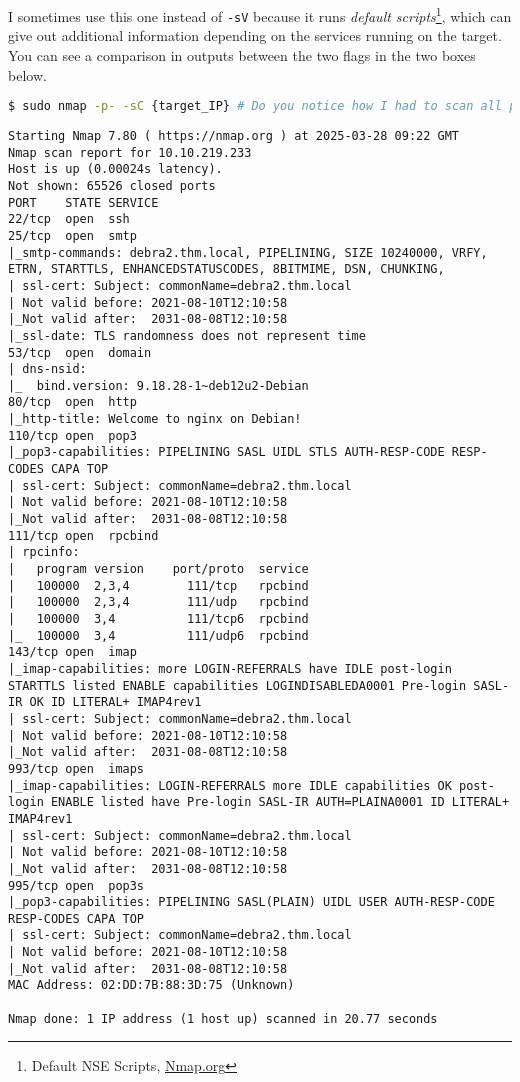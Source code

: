 \documentclass[11pt,a4paper]{article}
\newenvironment{commandbox}[1][]{
  \begin{tcolorbox}[
      colback=kalibackground,
      colframe=commandcolor,
      fonttitle=\bfseries\color{white},
      title=#1,
      breakable=true
    ]
  }{
  \end{tcolorbox}
}
\begin{document}
I sometimes use this one instead of \texttt{-sV} because it runs
\textit{default scripts}\footnote{Default NSE Scripts,
\href{https://nmap.org/nsedoc/categories/default.html}{Nmap.org}},
which can give out additional information depending on the services
running on the target. You can see a comparison in outputs between
the two flags in the two boxes below.
\begin{commandbox}[Default Script Scan]
\begin{lstlisting}[language=bash, style=bash, basicstyle=\scriptsize\ttfamily\color{warningcolor}, breaklines=true, breakindent=0pt]
$ sudo nmap -p- -sC {target_IP} # Do you notice how I had to scan all ports, not just the top 1000 most common?
\end{lstlisting}

\begin{lstlisting}[basicstyle=\scriptsize\ttfamily\color{kalitext}]
Starting Nmap 7.80 ( https://nmap.org ) at 2025-03-28 09:22 GMT
Nmap scan report for 10.10.219.233
Host is up (0.00024s latency).
Not shown: 65526 closed ports
PORT    STATE SERVICE
22/tcp  open  ssh
25/tcp  open  smtp
|_smtp-commands: debra2.thm.local, PIPELINING, SIZE 10240000, VRFY, ETRN, STARTTLS, ENHANCEDSTATUSCODES, 8BITMIME, DSN, CHUNKING,
| ssl-cert: Subject: commonName=debra2.thm.local
| Not valid before: 2021-08-10T12:10:58
|_Not valid after:  2031-08-08T12:10:58
|_ssl-date: TLS randomness does not represent time
53/tcp  open  domain
| dns-nsid:
|_  bind.version: 9.18.28-1~deb12u2-Debian
80/tcp  open  http
|_http-title: Welcome to nginx on Debian!
110/tcp open  pop3
|_pop3-capabilities: PIPELINING SASL UIDL STLS AUTH-RESP-CODE RESP-CODES CAPA TOP
| ssl-cert: Subject: commonName=debra2.thm.local
| Not valid before: 2021-08-10T12:10:58
|_Not valid after:  2031-08-08T12:10:58
111/tcp open  rpcbind
| rpcinfo:
|   program version    port/proto  service
|   100000  2,3,4        111/tcp   rpcbind
|   100000  2,3,4        111/udp   rpcbind
|   100000  3,4          111/tcp6  rpcbind
|_  100000  3,4          111/udp6  rpcbind
143/tcp open  imap
|_imap-capabilities: more LOGIN-REFERRALS have IDLE post-login STARTTLS listed ENABLE capabilities LOGINDISABLEDA0001 Pre-login SASL-IR OK ID LITERAL+ IMAP4rev1
| ssl-cert: Subject: commonName=debra2.thm.local
| Not valid before: 2021-08-10T12:10:58
|_Not valid after:  2031-08-08T12:10:58
993/tcp open  imaps
|_imap-capabilities: LOGIN-REFERRALS more IDLE capabilities OK post-login ENABLE listed have Pre-login SASL-IR AUTH=PLAINA0001 ID LITERAL+ IMAP4rev1
| ssl-cert: Subject: commonName=debra2.thm.local
| Not valid before: 2021-08-10T12:10:58
|_Not valid after:  2031-08-08T12:10:58
995/tcp open  pop3s
|_pop3-capabilities: PIPELINING SASL(PLAIN) UIDL USER AUTH-RESP-CODE RESP-CODES CAPA TOP
| ssl-cert: Subject: commonName=debra2.thm.local
| Not valid before: 2021-08-10T12:10:58
|_Not valid after:  2031-08-08T12:10:58
MAC Address: 02:DD:7B:88:3D:75 (Unknown)

Nmap done: 1 IP address (1 host up) scanned in 20.77 seconds
\end{lstlisting}
\end{commandbox}
\end{document}

